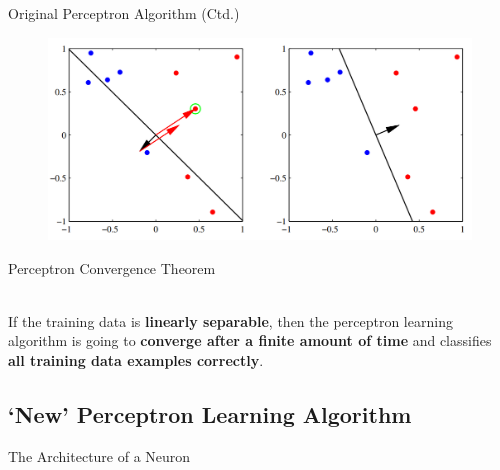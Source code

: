 \begin{frame}{Original Perceptron Algorithm (Ctd.)}{}
	\begin{figure}
		\centering
		\includegraphics[scale=0.35]{10_deep_learning/02_img/perceptron_2}
	\end{figure}
\end{frame}


\begin{frame}{Perceptron Convergence Theorem}{}
	\begin{boxBlue}
		 \\

		If the training data is \textbf{linearly separable}, then the perceptron learning algorithm is going to
		\textbf{converge after a finite amount of time} and classifies \textbf{all training data examples correctly}.
	\end{boxBlue}
\end{frame}


\subsection{`New' Perceptron Learning Algorithm}

\begin{frame}{The Architecture of a Neuron}{}
	
\end{frame}


